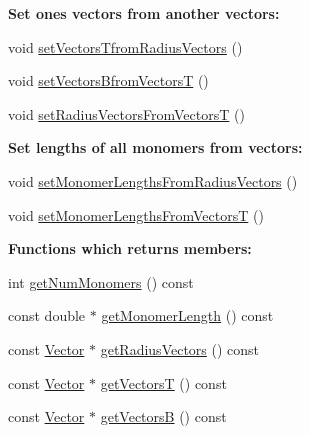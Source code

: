 \begin{Indent}{\bf Set ones vectors from another vectors\+:}\par
\begin{DoxyCompactItemize}
\item 
void \hyperlink{class_p_c_a_1_1_polymer_aa655eb1299b272fef8c91f003abbf50d}{set\+Vectors\+Tfrom\+Radius\+Vectors} ()
\item 
void \hyperlink{class_p_c_a_1_1_polymer_a8dad939cbc8d8df73784526ad4a07aef}{set\+Vectors\+Bfrom\+VectorsT} ()
\item 
void \hyperlink{class_p_c_a_1_1_polymer_a258f607c38c1a247dd37659b236aa3fa}{set\+Radius\+Vectors\+From\+VectorsT} ()
\end{DoxyCompactItemize}
\end{Indent}
\begin{Indent}{\bf Set lengths of all monomers from vectors\+:}\par
\begin{DoxyCompactItemize}
\item 
void \hyperlink{class_p_c_a_1_1_polymer_a2dae638afa952c286c16122c7ab52b6e}{set\+Monomer\+Lengths\+From\+Radius\+Vectors} ()
\item 
void \hyperlink{class_p_c_a_1_1_polymer_a217cddfa5b9e5bfe68f8e5d0802e2f31}{set\+Monomer\+Lengths\+From\+VectorsT} ()
\end{DoxyCompactItemize}
\end{Indent}
\begin{Indent}{\bf Functions which returns members\+:}\par
\begin{DoxyCompactItemize}
\item 
int \hyperlink{class_p_c_a_1_1_polymer_a5c87b083f77c06ffd14278f87dad47ea}{get\+Num\+Monomers} () const
\item 
const double $\ast$ \hyperlink{class_p_c_a_1_1_polymer_af05e598bcd1e9987aca46d0661ac6dca}{get\+Monomer\+Length} () const
\item 
const \hyperlink{class_p_c_a_1_1_vector}{Vector} $\ast$ \hyperlink{class_p_c_a_1_1_polymer_a6e913f9b50a164c828f9a3cb89e452e1}{get\+Radius\+Vectors} () const
\item 
const \hyperlink{class_p_c_a_1_1_vector}{Vector} $\ast$ \hyperlink{class_p_c_a_1_1_polymer_a83c92fb07eafc88d121ef4b4124319c3}{get\+VectorsT} () const
\item 
const \hyperlink{class_p_c_a_1_1_vector}{Vector} $\ast$ \hyperlink{class_p_c_a_1_1_polymer_a4a90f901ceb688b0d96b126cc2ba3678}{get\+VectorsB} () const
\end{DoxyCompactItemize}
\end{Indent}
